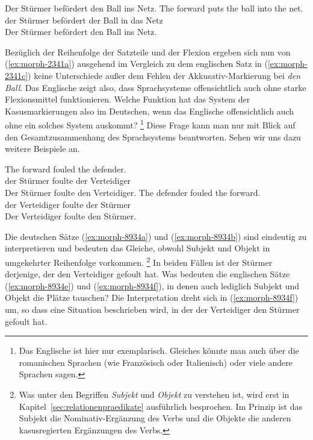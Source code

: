 \begin{exe}
  \ex\label{ex:morph2341}
  \begin{xlist}
    \ex\label{ex:morph-2341a} Der Stürmer befördert den Ball ins Netz.
    \ex\label{ex:morph-2341c} \gll The forward puts the ball into the net.\\
    der Stürmer befördert der Ball in das Netz\\
    \glt Der Stürmer befördert den Ball ins Netz.
  \end{xlist}
\end{exe}

Bezüglich der Reihenfolge der Satzteile und der Flexion ergeben sich nun von (\ref{ex:morph-2341a}) ausgehend im Vergleich zu dem englischen Satz in (\ref{ex:morph-2341c}) keine Unterschiede außer dem Fehlen der Akkusativ-Markierung bei \textit{den Ball}.
Das Englische zeigt also, dass Sprachsysteme offensichtlich auch ohne starke Flexionsmittel funktionieren.
Welche Funktion hat das System der Kasusmarkierungen also im Deutschen, wenn das Englische offensichtlich auch ohne ein solches System auskommt?%
\footnote{Das Englische ist hier nur exemplarisch.
Gleiches könnte man \zB auch über die romanischen Sprachen (wie Französisch oder Italienisch) oder viele andere Sprachen sagen.}
Diese Frage kann man nur mit Blick auf den Gesamtzusammenhang des Sprachsystems beantworten.
Sehen wir uns dazu weitere Beispiele an.

\begin{exe}
  \ex \label{ex:morph8934}
  \begin{xlist}
    \ex\label{ex:morph-8934e} \gll The forward fouled the defender.\\
    der Stürmer foulte der Verteidiger\\
    \glt Der Stürmer foulte den Verteidiger.
    \ex\label{ex:morph-8934f} \gll The defender fouled the forward.\\
    der Verteidiger foulte der Stürmer\\
    \glt Der Verteidiger foulte den Stürmer.
  \end{xlist}
\end{exe}

Die deutschen Sätze (\ref{ex:morph-8934a}) und (\ref{ex:morph-8934b}) sind eindeutig zu interpretieren und bedeuten das Gleiche, obwohl Subjekt und Objekt in umgekehrter Reihenfolge vorkommen.%
\footnote{Was unter den Begriffen \textit{Subjekt} und \textit{Objekt} zu verstehen ist, wird erst in Kapitel~\ref{sec:relationenpraedikate} ausführlich besprochen.
Im Prinzip ist das Subjekt die Nominativ-Ergänzung des Verbs und die Objekte die anderen kasusregierten Ergänzungen des Verbs.}
In beiden Fällen ist der Stürmer derjenige, der den Verteidiger gefoult hat.
Was bedeuten die englischen Sätze (\ref{ex:morph-8934e}) und (\ref{ex:morph-8934f}), in denen auch lediglich Subjekt und Objekt die Plätze tauschen?
Die Interpretation dreht sich in (\ref{ex:morph-8934f}) um, so dass eine Situation beschrieben wird, in der der Verteidiger den Stürmer gefoult hat.

